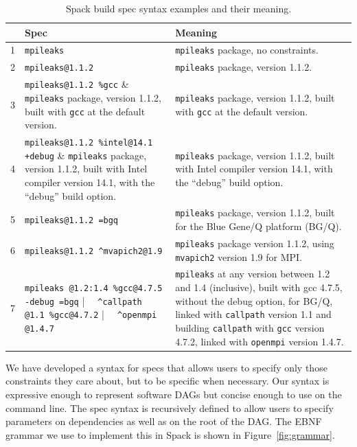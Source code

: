 \begin{table}\centering
\begin{tabular}{|r|p{2.4in}|p{4in}|}
\hline
& {\bf Spec} & {\bf Meaning} \\
\hline
\hline
1&\small\verb|mpileaks|                         & \small {\tt mpileaks} package, no constraints. \\\hline
2&\small\verb|mpileaks@1.1.2|                   & \small {\tt mpileaks} package, version 1.1.2. \\\hline
3&\small\verb|mpileaks@1.1.2 %gcc|              & \small {\tt mpileaks} package, version 1.1.2, built with {\tt gcc} at the default version. \\\hline
4&\small\verb|mpileaks@1.1.2 %intel@14.1 +debug| & \small {\tt mpileaks} package, version 1.1.2, built with Intel compiler version 14.1, \newline with the ``debug'' build option. \\\hline
5&\small\verb|mpileaks@1.1.2 =bgq|              & \small {\tt mpileaks} package, version 1.1.2, built for the Blue Gene/Q platform (BG/Q). \\\hline
6&\small\verb|mpileaks@1.1.2 ^mvapich2@1.9|     & \small {\tt mpileaks} package version 1.1.2, using {\tt mvapich2}  version 1.9 for MPI. \\\hline
7&\small\verb|mpileaks @1.2:1.4 %gcc@4.7.5 -debug =bgq| \newline
      \verb|  ^callpath @1.1 %gcc@4.7.2| \newline
      \verb|  ^openmpi @1.4.7|                & \small%
      {\tt mpileaks} at any version between 1.2 and 1.4 (inclusive), built with gcc 4.7.5,
      without the debug option, for BG/Q, linked with {\tt callpath} version 1.1
      and building {\tt callpath} with {\tt gcc} version 4.7.2, linked with {\tt openmpi} version 1.4.7.    \\
\hline
\end{tabular}
\caption{
	Spack build spec syntax examples and their meaning.
	\label{tab:specs}
}
\end{table}

We have developed a syntax for specs that allows users to specify
only those constraints they care about, but to be specific when necessary.
Our syntax is expressive enough to represent software DAGs  but concise enough to use
on the command line. The spec syntax is recursively defined to allow users to specify
parameters on dependencies as well as on the root of the DAG.  The EBNF grammar we use
to implement this in Spack is shown in Figure~\ref{fig:grammar}.

